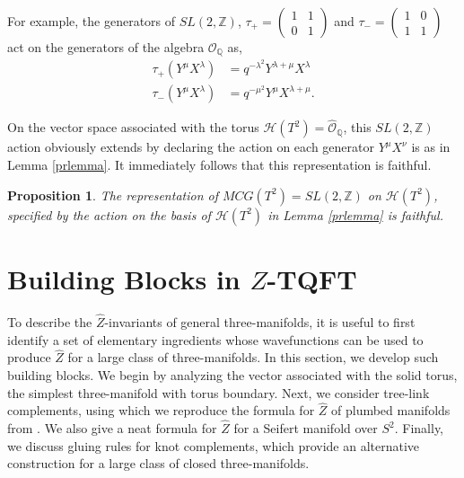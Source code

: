 \documentclass{article}
\newcommand{\Z}{{\mathbb Z}}
\newcommand{\Q}{{\mathbb Q}}
\newtheorem{proposition}{Proposition}[section]
\numberwithin{corollary}{theorem}
\numberwithin{corollary}{proposition}
\begin{document}
For example, the generators of $SL(2,\Z)$, $\tau_{+} = \begin{pmatrix}
1 & 1 \\
0 & 1 
\end{pmatrix}$ and $ \tau_{-} = \begin{pmatrix}
1 & 0 \\
1 & 1 
\end{pmatrix} $ act on the generators of the algebra $\mathcal{O}_{\Q} $ as,
\begin{align}
    \tau_{+}( Y^{\mu} X^{\lambda} ) &= q^{-\lambda^{2}}Y^{\lambda+\mu} X^{\lambda} \\
    \tau_{-}( Y^{\mu} X^{\lambda} ) &= q^{-\mu^{2}}Y^{\mu} X^{\lambda + \mu }.
\end{align}

On the vector space associated with the torus $\mathcal{H}(T^2) = \hat{\mathcal{O}}_\Q$, this $SL(2,\Z)$ action obviously extends by declaring the action on each generator $Y^\mu X^\nu$ is as in Lemma \ref{prlemma}. It immediately follows that this representation is faithful. 

\begin{proposition}
    The representation of $MCG(T^2) = SL(2,\Z)$ on $\mathcal{H}(T^2)$, specified by the action on the basis of $\mathcal{H}(T^2)$ in Lemma \ref{prlemma} is faithful.
\end{proposition}















\section{Building Blocks in \texorpdfstring{$\hat{Z}$}{Z}-TQFT} 

To describe the $\hat{Z}$-invariants of general three-manifolds, it is useful to first identify a set of elementary ingredients whose wavefunctions can be used to produce $\hat{Z}$ for a large class of three-manifolds. In this section, we develop such building blocks. We begin by analyzing the vector associated with the solid torus, the simplest three-manifold with torus boundary. Next, we consider tree-link complements, using which we reproduce the formula for $\hat{Z}$ of plumbed manifolds from \cite{GPPV}. We also give a neat formula for $\hat{Z}$ for a Seifert manifold over $S^{2}$. Finally, we discuss gluing rules for knot complements, which provide an alternative construction for a large class of closed three-manifolds.
\end{document}
